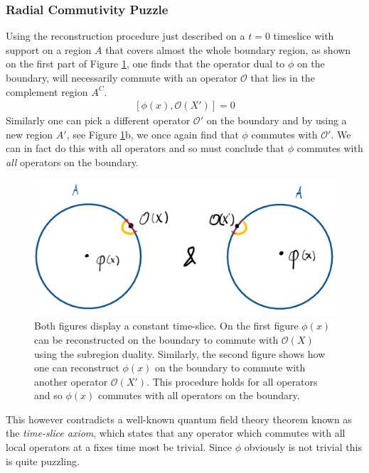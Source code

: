\documentclass[letter,12pt]{article}
\newcommand{\BO}{\mathcal{O}}
\newcommand{\OO}{\mathcal{O}}
\begin{document}
\subsubsection*{Radial Commutivity Puzzle}
Using the reconstruction procedure just described on a $t=0$ timeslice with support on a region $A$ that covers almost the whole boundary region, as shown on the first part of Figure \ref{fig:adscftfig3}, one finds that the operator dual to $\phi$ on the boundary, will necessarily commute with an operator $\OO$ that lies in the complement region $A^C$. 
\begin{equation}
	\begin{aligned}
		\left[\phi(x),\BO(X')\right]=0
	\end{aligned}
\end{equation}
Similarly one can pick a different operator $\OO '$ on the boundary and by using a new region $A'$, see Figure \ref{fig:adscftfig3}b, we once again find that $\phi$ commutes with $\OO '$. We can in fact do this with all operators and so must conclude that $\phi$ commutes with \textit{all} operators on the boundary.
\begin{figure}[]
	\centering
	\includegraphics[width=0.75\linewidth]{ADS_CFT_Fig3}
	\caption{Both figures display a constant time-slice. On the first figure $\phi(x)$ can be reconstructed on the boundary to commute with $\OO(X)$ using the subregion duality. Similarly, the second figure shows how one can reconstruct $\phi(x)$ on the boundary to commute with another operator $\OO(X')$. This procedure holds for all operators and so $\phi(x)$ commutes with all operators on the boundary.}
	\label{fig:adscftfig3}
\end{figure}
This however contradicts a well-known quantum field theory theorem known as the \textit{time-slice axiom}, which states that any operator which commutes with all local operators at a fixes time most be trivial. Since $\phi$ obviously is not trivial this is quite puzzling.
\end{document}
